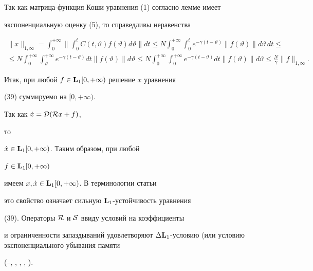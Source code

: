 Так как матрица-функция Коши уравнения (1) согласно лемме имеет


экспоненциальную оценку (5), то справедливы неравенства


%


\begin{multline*}


\|x\|_{1,\infty}=\int_0^{+\infty}\biggl\|\int_0^tC(t,


\vartheta)f(\vartheta)d\vartheta\biggr\|dt\le


N\int_0^{+\infty}\int_0^te^{-\gamma(t-\vartheta)}\|


f(\vartheta)\|d\vartheta\,dt\le \\


%


\le N\int_0^{+\infty}\int_\vartheta^{+\infty}e^{-\gamma(t-\vartheta)}


dt\|f(\vartheta)\|d\vartheta\le


N\int_0^{+\infty}\int_0^{+\infty}e^{-\gamma(t-\vartheta)}


dt\|f(\vartheta)\|d\vartheta\le\frac{N}{\gamma}\|f\|_{1,\infty}.


\end{multline*}





Итак, при любой $f\in\bold L_1[0,+\infty)$ решение $x$ уравнения


(39) суммируемо на $[0,+\infty)$.





Так как $\Dot x={\cal D}({\cal R}x+f)$,


то


$\Dot x\in\bold L_1[0,+\infty)$. Таким образом, при любой


$f\in\bold L_1[0,+\infty)$


имеем $x,\Dot x\in\bold L_1[0,+\infty)$. В терминологии статьи


\cite{Az2}


это свойство означает сильную $\bold L_1$-устойчивость уравнения


(39). Операторы ${\cal R}$ и ${\cal S}$ ввиду условий на коэффициенты


и ограниченности запаздываний удовлетворяют $\Delta\bold 


L_1$-условию \cite{Az2} (или условию экспоненциального убывания памяти


(\cite{Ku1}--\cite{Ku3}, \cite{Si3}, \cite{Si4}, \cite{Ku4}, \cite{Ku5}).


